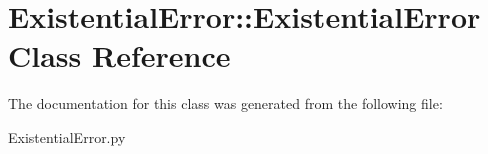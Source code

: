 \hypertarget{classExistentialError_1_1ExistentialError}{\section{\-Existential\-Error\-:\-:\-Existential\-Error \-Class \-Reference}
\label{classExistentialError_1_1ExistentialError}
}


\-The documentation for this class was generated from the following file\-:\begin{DoxyCompactItemize}
\item 
\-Existential\-Error.\-py\end{DoxyCompactItemize}
